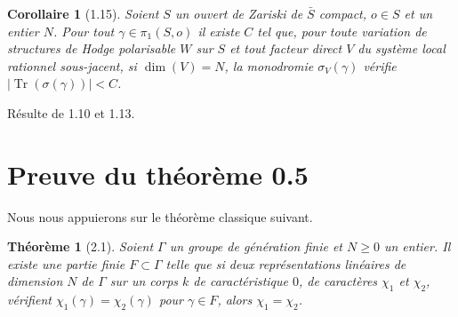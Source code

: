 \documentclass[12pt,a4paper]{article}
\theoremstyle{plain}
\newtheorem{theorem}{Th\'{e}or\`{e}me}[section]
\newtheorem{corollary}{Corollaire}[section]
\theoremstyle{definition}
\DeclareMathOperator{\Tr}{Tr}
\begin{document}
\begin{corollary}[1.15]
Soient $S$ un ouvert de Zariski de $\bar{S}$ compact, $o \in S$ et un entier $N$. Pour tout $\gamma \in \pi_{1}(S,o)$ il existe $C$ tel que, pour toute variation de structures de Hodge polarisable $W$ sur $S$ et tout facteur direct $V$ du syst\`{e}me local rationnel sous-jacent, si $\dim(V) = N$, la monodromie $\sigma_{V}(\gamma)$ v\'{e}rifie $|\Tr(\sigma(\gamma))| < C$.
\end{corollary}

R\'{e}sulte de 1.10 et 1.13.


\section{Preuve du th\'{e}or\`{e}me 0.5}

Nous nous appuierons sur le th\'{e}or\`{e}me classique suivant.

\begin{theorem}[2.1]
Soient $\Gamma$ un groupe de g\'{e}n\'{e}ration finie et $N \geq 0$ un entier. Il existe une partie finie $F \subset \Gamma$ telle que si deux repr\'{e}sentations lin\'{e}aires de dimension $N$ de $\Gamma$ sur un corps $k$ de caract\'{e}ristique $0$, de caract\`{e}res $\chi_{1}$ et $\chi_{2}$, v\'{e}rifient $\chi_{1}(\gamma) = \chi_{2}(\gamma)$ pour $\gamma \in F$, alors $\chi_{1} = \chi_{2}$.
\end{theorem}
\end{document}
